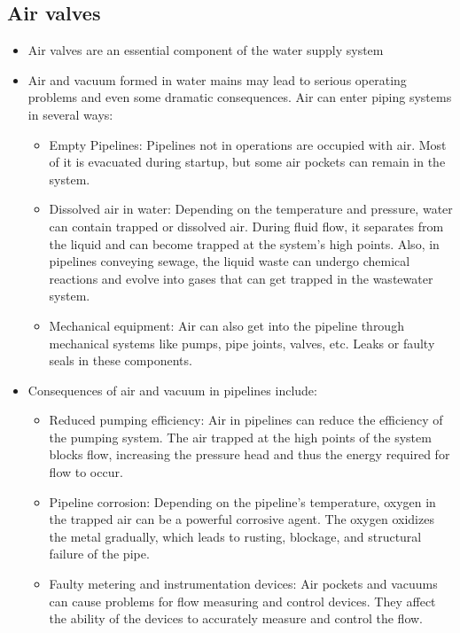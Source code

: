 \subsection{Air valves}

  \begin{itemize}
   \item Air valves are an essential component of the water supply system
\item Air and vacuum formed in water mains may lead to serious operating problems and even some dramatic consequences. Air can enter piping systems in several ways:
\begin{itemize}
\item Empty Pipelines:  Pipelines not in operations are occupied with air. Most of it is evacuated during startup, but some air pockets can remain in the system.
 
\item Dissolved air in water: Depending on the temperature and pressure, water can contain trapped or dissolved air. During fluid flow, it separates from the liquid and can become trapped at the system’s high points. Also, in pipelines conveying sewage, the liquid waste can undergo chemical reactions and evolve into gases that can get trapped in the wastewater system.
 
\item Mechanical equipment: Air can also get into the pipeline through mechanical systems like pumps, pipe joints, valves, etc. Leaks or faulty seals in these components.

\end{itemize}
\item Consequences of air and vacuum in pipelines include:
\begin{itemize}
\item Reduced pumping efficiency: Air in pipelines can reduce the efficiency of the pumping system. The air trapped at the high points of the system blocks flow, increasing the pressure head and thus the energy required for flow to occur.
 
\item Pipeline corrosion: Depending on the pipeline's temperature, oxygen in the trapped air can be a powerful corrosive agent. The oxygen oxidizes the metal gradually, which leads to rusting, blockage, and structural failure of the pipe.
 
\item Faulty metering and instrumentation devices: Air pockets and vacuums can cause problems for flow measuring and control devices. They affect the ability of the devices to accurately measure and control the flow.
 

\end{itemize}
\end{itemize}
